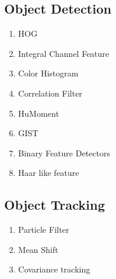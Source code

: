 \subsection{Object Detection}

\begin{enumerate}
    \item HOG
    \item Integral Channel Feature
    \item Color Histogram
    \item Correlation Filter
    \item HuMoment
    \item GIST
    \item Binary Feature Detectors
    \item Haar like feature
\end{enumerate}

\subsection{Object Tracking}

\begin{enumerate}
    \item Particle Filter
    \item Mean Shift
    \item Covariance tracking
\end{enumerate}

